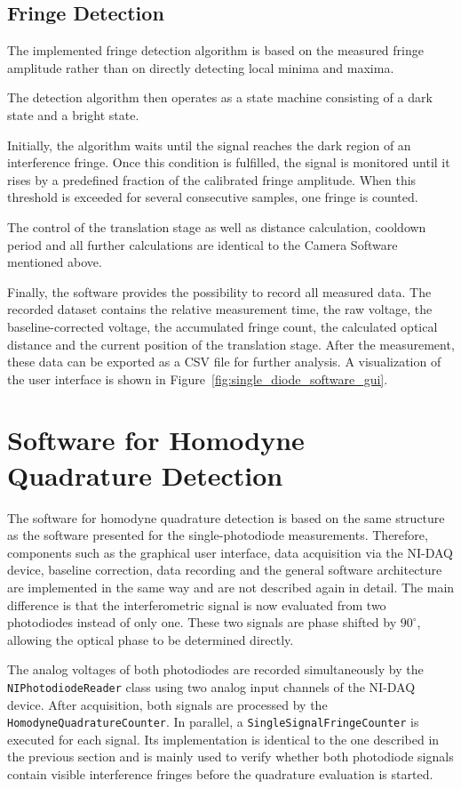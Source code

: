 \subsection{Fringe Detection}

The implemented fringe detection algorithm is based on the measured fringe amplitude rather than on directly detecting local minima and maxima. 

The detection algorithm then operates as a state machine consisting of a dark state and a bright state.

Initially, the algorithm waits until the signal reaches the dark region of an interference fringe. Once this condition is fulfilled, the signal is monitored until it rises by a predefined fraction of the calibrated fringe amplitude. When this threshold is exceeded for several consecutive samples, one fringe is counted.

The control of the translation stage as well as distance calculation, cooldown period and all further calculations are identical to the Camera Software mentioned above.

Finally, the software provides the possibility to record all measured data. The recorded dataset contains the relative measurement time, the raw voltage, the baseline-corrected voltage, the accumulated fringe count, the calculated optical distance and the current position of the translation stage. After the measurement, these data can be exported as a CSV file for further analysis. A visualization of the user interface is shown in Figure~\ref{fig:single_diode_software_gui}.

\section{Software for Homodyne Quadrature Detection}

The software for homodyne quadrature detection is based on the same structure as the software presented for the single-photodiode measurements. Therefore, components such as the graphical user interface, data acquisition via the NI-DAQ device, baseline correction, data recording and the general software architecture are implemented in the same way and are not described again in detail. The main difference is that the interferometric signal is now evaluated from two photodiodes instead of only one. These two signals are phase shifted by \(90^\circ\), allowing the optical phase to be determined directly.

The analog voltages of both photodiodes are recorded simultaneously by the \texttt{NIPhotodiode\-Reader} class using two analog input channels of the NI-DAQ device. After acquisition, both signals are processed by the \texttt{HomodyneQuadrature\-Counter}. In parallel, a \texttt{SingleSignalFringe\-Counter} is executed for each signal. Its implementation is identical to the one described in the previous section and is mainly used to verify whether both photodiode signals contain visible interference fringes before the quadrature evaluation is started.


